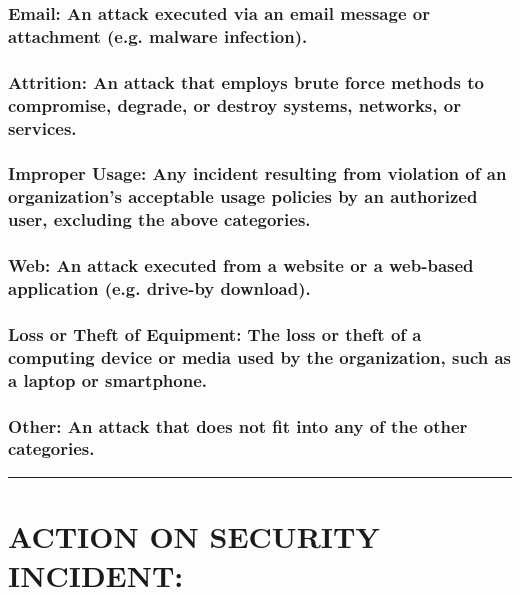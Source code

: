 \documentclass[10pt,british,english]{article}
\begin{document}
\subsubsection{Email: An attack executed via an email message or attachment (e.g.
malware infection).}

\subsubsection{Attrition: An attack that employs brute force methods to compromise,
degrade, or destroy systems, networks, or services. }

\subsubsection{Improper Usage: Any incident resulting from violation of an organization\textquoteright s
acceptable usage policies by an authorized user, excluding the above
categories.}

\subsubsection{Web: An attack executed from a website or a web-based application
(e.g. drive-by download).}

\subsubsection{Loss or Theft of Equipment: The loss or theft of a computing device
or media used by the organization, such as a laptop or smartphone.}

\subsubsection{Other: An attack that does not fit into any of the other categories.}

\rule[0.5ex]{1\columnwidth}{1pt}

\section{ACTION ON SECURITY INCIDENT:}
\end{document}
